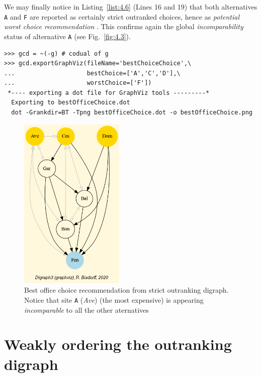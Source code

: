 We may finally notice in Listing~\ref{list:4.6} (Lines 16 and 19) that both alternatives \texttt{A} and \texttt{F} are reported as certainly strict outranked choices, hence as \emph{potential worst choice recommendation} . This confirms again the global \emph{incomparability} status of alternative \texttt{A} (see Fig.~\ref{fig:4.3}).
\begin{lstlisting}
>>> gcd = ~(-g) # codual of g
>>> gcd.exportGraphViz(fileName='bestChoiceChoice',\
...                    bestChoice=['A','C','D'],\
...                    worstChoice=['F'])
 *---- exporting a dot file for GraphViz tools ---------*
  Exporting to bestOfficeChoice.dot
  dot -Grankdir=BT -Tpng bestOfficeChoice.dot -o bestOfficeChoice.png
\end{lstlisting}
\begin{figure}[h]
\sidecaption[t]
\includegraphics[width=5cm]{Figures/bestOfficeChoice.png}
\caption{Best office choice recommendation from strict outranking digraph. Notice that site \texttt{A} (\emph{Ave}) (the most expensive) is appearing \emph{incomparable} to all the other aternatives}
\label{fig:4.4}       %
\end{figure}

\section{Weakly ordering the outranking digraph}
\label{sec:4.6}

